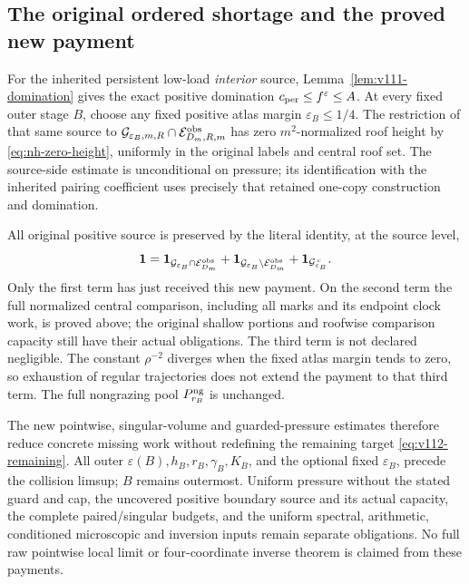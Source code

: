 \subsection{The original ordered shortage and the proved new payment}
For the inherited persistent low-load \emph{interior} source,
Lemma~\ref{lem:v111-domination} gives the exact positive
domination $c_{\rm per}\le f^\varepsilon\le A$.
At every fixed outer stage $B$, choose any fixed positive atlas
margin $\varepsilon_B\le1/4$.  The restriction of that same
source to
$\mathcal G_{\varepsilon_B,m,R}\cap
 \mathcal E^{\rm obs}_{D_m,R,m}$ has zero $m^2$-normalized
roof height by \eqref{eq:nh-zero-height}, uniformly in the
original labels and central roof set.  The source-side estimate
is unconditional on pressure; its identification with the
inherited pairing coefficient uses precisely that retained
one-copy construction and domination.

All original positive source is preserved by the literal
identity, at the source level,
\[
 \mathbf1=\mathbf1_{\mathcal G_{\varepsilon_B}\cap\mathcal E^{\rm obs}_{D_m}}
      +\mathbf1_{\mathcal G_{\varepsilon_B}\setminus\mathcal E^{\rm obs}_{D_m}}
      +\mathbf1_{\mathcal G_{\varepsilon_B}^{\,c}}.
\]
Only the first term has just received this new payment.  On the
second term the full normalized central comparison, including
all marks and its endpoint clock work, is proved above; the
original shallow portions and roofwise comparison capacity
still have their actual obligations.  The third term is not
declared negligible.  The constant $\rho^{-2}$ diverges when
the fixed atlas margin tends to zero, so exhaustion of regular
trajectories does not extend the payment to that third term.
The full nongrazing pool $P_{r_B}^{\rm ng}$ is unchanged.

The new pointwise, singular-volume and guarded-pressure estimates
therefore reduce concrete missing work without redefining the
remaining target \eqref{eq:v112-remaining}.  All outer
$\varepsilon(B),h_B,r_B,\gamma_B,K_B$, and the optional fixed
$\varepsilon_B$, precede the collision limsup; $B$ remains
outermost.  Uniform pressure without the stated guard and cap,
the uncovered positive boundary source and its actual capacity,
the complete paired/singular budgets, and the uniform spectral,
arithmetic, conditioned microscopic and inversion inputs remain
separate obligations.  No full raw pointwise local limit or
four-coordinate inverse theorem is claimed from these payments.
